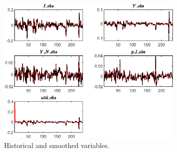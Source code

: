  
\begin{figure}[H]
\centering 
\includegraphics[width=0.80\textwidth]{BRS_imp_mobility/graphs/BRS_imp_mobility_HistoricalAndSmoothedVariables1}
\caption{Historical and smoothed variables.}\label{Fig:HistoricalAndSmoothedVariables:1}
\end{figure}


